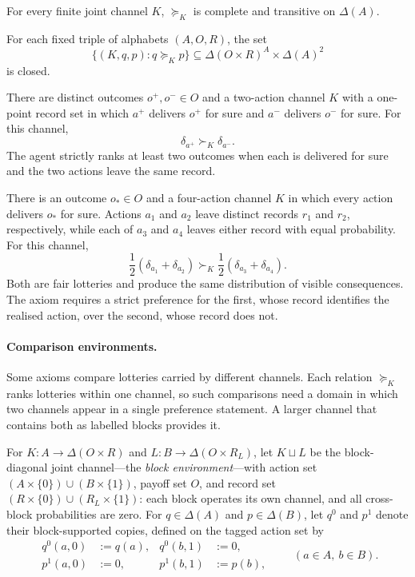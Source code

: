 \documentclass[11pt,a4paper]{article}
\theoremstyle{definition}
\newcommand{\D}{\Delta}
\newcommand{\1}{\mathbf 1}
\begin{document}
\begin{description}[leftmargin=*,style=sameline]

\item[(A1) Weak order.]
For every finite joint channel $K$, $\succeq_K$ is complete and transitive on $\D(A)$.

\item[(A2) Continuity.]
For each fixed triple of alphabets $(A,O,R)$, the set
\[
 \{(K,q,p):q\succeq_Kp\}
 \subseteq \D(O\times R)^A\times\D(A)^2
\]
is closed.


\item[(A3) Material relevance.]
There are distinct outcomes $o^+,o^-\in O$ and a two-action channel $K$ with a one-point record set in which $a^+$ delivers
$o^+$ for sure and $a^-$ delivers $o^-$ for sure.  For this channel,
\[
 \delta_{a^+}\succ_K\delta_{a^-}.
\]
The agent strictly ranks at least two outcomes when each is delivered for sure and the two actions leave the same record.

\item[(A4) Trace relevance.]
There is an outcome $o_\ast\in O$ and a four-action channel $K$ in which every action delivers $o_\ast$ for
sure.  Actions $a_1$ and $a_2$ leave distinct records $r_1$ and $r_2$, respectively, while each of $a_3$ and
$a_4$ leaves either record with equal probability.  For this channel,
\[
 \frac12(\delta_{a_1}+\delta_{a_2})
 \succ_K
 \frac12(\delta_{a_3}+\delta_{a_4}).
\]
Both are fair lotteries and produce the same distribution of visible consequences. The axiom requires a strict
preference for the first, whose record identifies the realised action, over the second, whose record does not.

\end{description}

\paragraph{Comparison environments.}
Some axioms compare lotteries carried by different channels.  Each relation $\succeq_K$ ranks lotteries within
one channel, so such comparisons need a domain in which two channels appear in a single preference statement.  A
larger channel that contains both as labelled blocks provides it.

For
$K:A\to\D(O\times R)$ and $L:B\to\D(O\times R_L)$, let $K\sqcup L$ be the block-diagonal joint channel---the
\emph{block environment}---with action set
$(A\times\{0\})\cup(B\times\{1\})$, payoff set $O$, and record set
$(R\times\{0\})\cup(R_L\times\{1\})$: each block operates its own channel, and all cross-block probabilities
are zero.  For $q\in\D(A)$ and $p\in\D(B)$,
let $q^0$ and $p^1$ denote their
block-supported copies, defined on the tagged action set by
\[
\begin{aligned}
 q^0(a,0)&:=q(a), & q^0(b,1)&:=0,\\
 p^1(a,0)&:=0,    & p^1(b,1)&:=p(b),
\end{aligned}
\qquad(a\in A,\ b\in B).
\]
\end{document}
